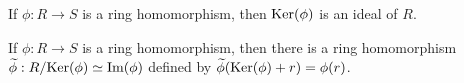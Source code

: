 \begin{theorem}
	If $\phi : R \rightarrow S$ is a ring homomorphism, then $\text{Ker}(\phi)$ is an
	ideal of $R$.
\end{theorem}

\begin{theorem}
	If $\phi : R \rightarrow S$ is a ring homomorphism, then there is a ring
	homomorphism $\widetilde{\phi} : R/\text{Ker}(\phi) \simeq \text{Im}(\phi)$ defined by
	$\widetilde{\phi}(\text{Ker}(\phi) + r) = \phi(r)$.
\end{theorem}
